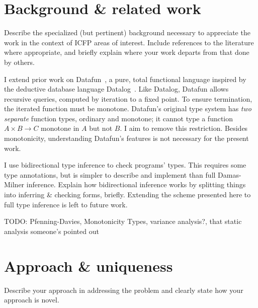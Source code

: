 \documentclass[sigplan,screen,dvipsnames]{acmart}
\newcommand\x\times
\newcommand\todo[1]{{\color{Purple}#1}}
\begin{document}

\section{Background \& related work}

\todo{
Describe the specialized (but pertinent) background necessary to appreciate
the work in the context of ICFP areas of interest. Include references to the
literature where appropriate, and briefly explain where your work departs
from that done by others.
}

\newcommand\mto{\overset{+}{\to}}

I extend prior work on Datafun~\citep{datafun}, a pure, total functional
language inspired by the deductive database language Datalog~\citep{datalog}.
%
Like Datalog, Datafun allows recursive queries, computed by iteration to a fixed point. To ensure termination, the iterated function must be monotone.
%
Datafun's original type system has \emph{two separate} function types, ordinary
and monotone; it cannot type a function $A \x B \to C$ monotone in $A$ but not
$B$. I aim to remove this restriction. Besides monotonicity, understanding
Datafun's features is not necessary for the present work.

I use bidirectional type inference \cite{bidirectional} to check programs' types. This requires some type annotations, but is simpler to describe and implement than full Damas-Milner inference. \todo{Explain how bidirectional inference works by splitting things into inferring \& checking forms, briefly.} Extending the scheme presented here to full type inference is left to future work.


\todo{TODO: Pfenning-Davies, Monotonicity Types, variance analysis?, that static analysis someone's pointed out}


\section{Approach \& uniqueness}
\todo{Describe your approach in addressing the problem and clear\-ly state how
  your approach is novel.}

\end{document}
